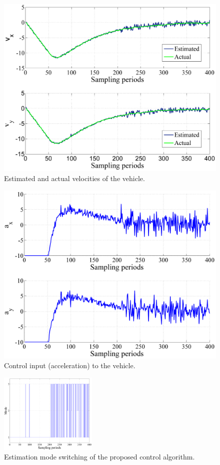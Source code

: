\begin{figure}
  \centering
  \includegraphics[width=0.80\columnwidth]{figs/velocities_scissored.pdf}
  \caption{Estimated and actual velocities of the vehicle.}
  \label{fig:velocities}
\end{figure}

\begin{figure}
  \centering
  \includegraphics[width=0.80\columnwidth]{figs/inputs_scissored.pdf}
  \caption{Control input (acceleration) to the vehicle.}
  \label{fig:inputs}
\end{figure}

\begin{figure}
  \centering
  \includegraphics[width=0.9\columnwidth, height=38mm]{figs/ModePicked_scissored.pdf}
  \caption{Estimation mode switching of the proposed control algorithm.}
  \label{fig:modes}
\end{figure}


